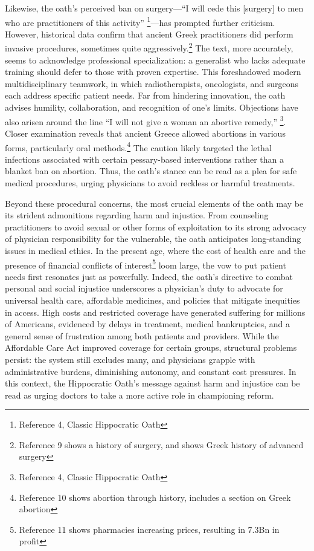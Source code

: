 \documentclass[12pt]{article}
\begin{document}
Likewise, the oath’s perceived ban on surgery—“I will cede this [surgery] to men who are practitioners of this activity”
\footnote{Reference 4, Classic Hippocratic Oath}—has prompted further criticism. However, historical data confirm that 
ancient Greek practitioners did perform invasive procedures, sometimes quite aggressively.\footnote{Reference 9 shows a history of surgery, and shows Greek history of advanced surgery} The text, more accurately, 
seems to acknowledge professional specialization: a generalist who lacks adequate training should defer to those with proven expertise. 
This foreshadowed modern multidisciplinary teamwork, in which radiotherapists, oncologists, and surgeons each address specific 
patient needs. Far from hindering innovation, the oath advises humility, collaboration, and recognition of one’s limits. 
Objections have also arisen around the line “I will not give a woman an abortive remedy,”
\footnote{Reference 4, Classic Hippocratic Oath}. Closer examination reveals 
that ancient Greece allowed abortions in various forms, particularly oral methods.\footnote{Reference 10 shows abortion through history, includes a section on Greek abortion} The caution likely targeted the lethal 
infections associated with certain pessary-based interventions rather than a blanket ban on abortion. Thus, the oath’s 
stance can be read as a plea for safe medical procedures, urging physicians to avoid reckless or harmful treatments.

\bigskip

Beyond these procedural concerns, the most crucial elements of the oath may be its strident admonitions regarding harm and injustice.
From counseling practitioners to avoid sexual or other forms of exploitation to its strong advocacy of physician responsibility for the vulnerable, 
the oath anticipates long-standing issues in medical ethics. In the present age, where the cost of health care and the presence of financial conflicts of interest\footnote{Reference 11 shows pharmacies increasing prices, resulting in 7.3Bn in profit } loom large, the vow to put patient needs first resonates
just as powerfully. Indeed, the oath’s directive to combat personal and social injustice underscores a physician’s duty to advocate for universal
health care, affordable medicines, and policies that mitigate inequities in access. High costs and restricted coverage have generated suffering 
for millions of Americans, evidenced by delays in treatment, medical bankruptcies, and a general sense of frustration among both patients and 
providers. While the Affordable Care Act improved coverage for certain groups, structural problems persist: the system still excludes many, 
and physicians grapple with administrative burdens, diminishing autonomy, and constant cost pressures. In this context, the 
Hippocratic Oath’s message against harm and injustice can be read as urging doctors to take a more active role in championing reform.
\end{document}
